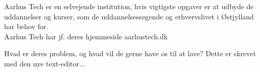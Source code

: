 Aarhus Tech er en selvejende institution, hvis vigtigste opgaver er at udbyde de uddannelser og kurser, som de uddannelsessøgende og erhvervslivet i Østjylland har behov for.
\\
Aarhus Tech har jf. deres hjemmeside {\if aarhustech.dk} 


Hvad er deres problem, og hvad vil de gerne have os til at lave? Dette er skrevet med den nye text-editor... 




